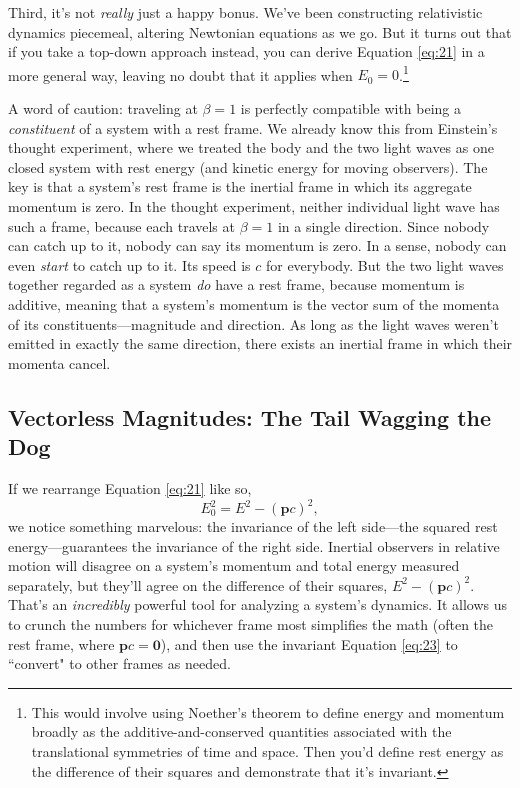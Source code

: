 \documentclass[12pt]{article}
\renewcommand{\vv}[1]{\mathbf{#1}}
\begin{document}
Third, it's not \emph{really} just a happy bonus. We've been constructing relativistic dynamics piecemeal, altering Newtonian equations as we go. But it turns out that if you take a top-down approach instead, you can derive Equation \ref{eq:21} in a more general way, leaving no doubt that it applies when $E_0 = 0$.\footnote{This would involve using Noether's theorem to define energy and momentum broadly as the additive-and-conserved quantities associated with the translational symmetries of time and space. Then you'd define rest energy as the difference of their squares and demonstrate that it's invariant.}

A word of caution: traveling at $\beta = 1$ is perfectly compatible with being a \emph{constituent} of a system with a rest frame. We already know this from Einstein's thought experiment, where we treated the body and the two light waves as one closed system with rest energy (and kinetic energy for moving observers). The key is that a system's rest frame is the inertial frame in which its aggregate momentum is zero. In the thought experiment, neither individual light wave has such a frame, because each travels at $\beta = 1$ in a single direction. Since nobody can catch up to it, nobody can say its momentum is zero. In a sense, nobody can even \emph{start} to catch up to it. Its speed is $c$ for everybody. But the two light waves together regarded as a system \emph{do} have a rest frame, because momentum is additive, meaning that a system's momentum is the vector sum of the momenta of its constituents---magnitude and direction. As long as the light waves weren't emitted in exactly the same direction, there exists an inertial frame in which their momenta cancel.



\subsection{Vectorless Magnitudes: The Tail Wagging the Dog}

If we rearrange Equation \ref{eq:21} like so,
\begin{equation}\label{eq:23}
E_0^2=E^2-(\vv p c)^2,
\end{equation}
we notice something marvelous: the invariance of the left side---the squared rest energy---guarantees the invariance of the right side. Inertial observers in relative motion will disagree on a system's momentum and total energy measured separately, but they'll agree on the difference of their squares, $E^2-(\vv p c)^2$. That's an \emph{incredibly} powerful tool for analyzing a system's dynamics. It allows us to crunch the numbers for whichever frame most simplifies the math (often the rest frame, where $\vv p c = \vv 0$), and then use the invariant Equation \ref{eq:23} to ``convert" to other frames as needed.
\end{document}
